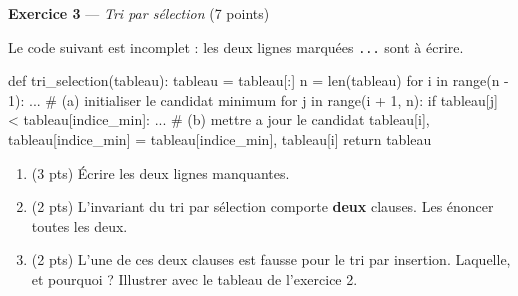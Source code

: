 \bigskip

\textbf{Exercice 3} --- \textit{Tri par sélection} \hfill (7 points)

Le code suivant est incomplet : les deux lignes marquées \lstinline{...} sont à écrire.

\begin{python}
def tri_selection(tableau):
    tableau = tableau[:]
    n = len(tableau)
    for i in range(n - 1):
        ...                     # (a) initialiser le candidat minimum
        for j in range(i + 1, n):
            if tableau[j] < tableau[indice_min]:
                ...             # (b) mettre a jour le candidat
        tableau[i], tableau[indice_min] = tableau[indice_min], tableau[i]
    return tableau
\end{python}

\begin{enumerate}
  \item (3 pts) Écrire les deux lignes manquantes.
  \item (2 pts) L'invariant du tri par sélection comporte \textbf{deux} clauses. Les énoncer toutes les deux.
  \item (2 pts) L'une de ces deux clauses est fausse pour le tri par insertion. Laquelle, et pourquoi ? Illustrer avec le tableau de l'exercice 2.
\end{enumerate}

